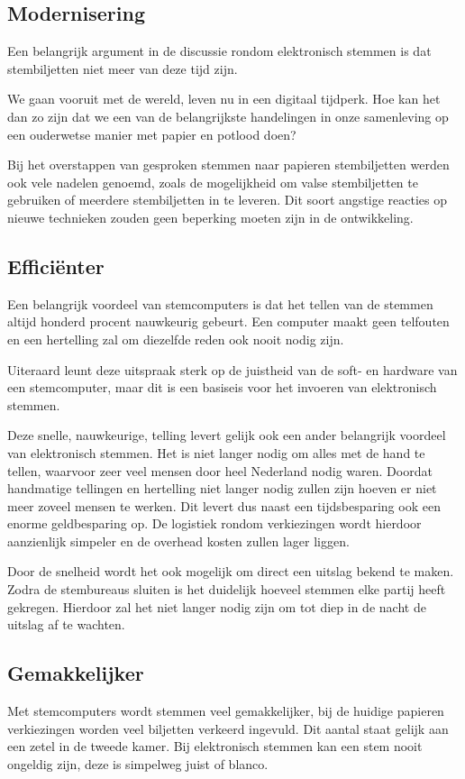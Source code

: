 \documentclass[a4paper]{article}
\newcommand{\TODO}[1]{{\color{red}\textbf{TODO: #1}}}
\renewcommand{\TODO}[1]{}
\begin{document}
\subsection{Modernisering}
Een belangrijk argument in de discussie rondom elektronisch stemmen is dat stembiljetten niet meer van deze tijd zijn.
\TODO{Flut argument}
We gaan vooruit met de wereld, leven nu in een digitaal tijdperk.
Hoe kan het dan zo zijn dat we een van de belangrijkste handelingen in onze samenleving op een ouderwetse manier met papier en potlood doen?

Bij het overstappen van gesproken stemmen naar papieren stembiljetten werden ook vele nadelen genoemd, zoals de mogelijkheid om valse stembiljetten te gebruiken of meerdere stembiljetten in te leveren.
Dit soort angstige reacties op nieuwe technieken zouden geen beperking moeten zijn in de ontwikkeling.

\subsection{Effici{\"e}nter}
Een belangrijk voordeel van stemcomputers is dat het tellen van de stemmen altijd honderd procent nauwkeurig gebeurt.
Een computer maakt geen telfouten en een hertelling zal om diezelfde reden ook nooit nodig zijn.
\TODO{en ook nooit mogelijk, niet altijd 100procent}
Uiteraard leunt deze uitspraak sterk op de juistheid van de soft- en hardware van een stemcomputer, maar dit is een basiseis voor het invoeren van elektronisch stemmen.

Deze snelle, nauwkeurige, telling levert gelijk ook een ander belangrijk voordeel van elektronisch stemmen.
Het is niet langer nodig om alles met de hand te tellen, waarvoor zeer veel mensen door heel Nederland nodig waren.
Doordat handmatige tellingen en hertelling niet langer nodig zullen zijn hoeven er niet meer zoveel mensen te werken.
Dit levert dus naast een tijdsbesparing ook een enorme geldbesparing op.
De logistiek rondom verkiezingen wordt hierdoor aanzienlijk simpeler en de overhead kosten zullen lager liggen.

Door de snelheid wordt het ook mogelijk om direct een uitslag bekend te maken.
Zodra de stembureaus sluiten is het duidelijk hoeveel stemmen elke partij heeft gekregen.
Hierdoor zal het niet langer nodig zijn om tot diep in de nacht de uitslag af te wachten.

\subsection{Gemakkelijker}
Met stemcomputers wordt stemmen veel gemakkelijker, bij de huidige papieren verkiezingen worden veel biljetten verkeerd ingevuld.
Dit aantal staat gelijk aan een zetel in de tweede kamer.
Bij elektronisch stemmen kan een stem nooit ongeldig zijn, deze is simpelweg juist of blanco.
\end{document}
